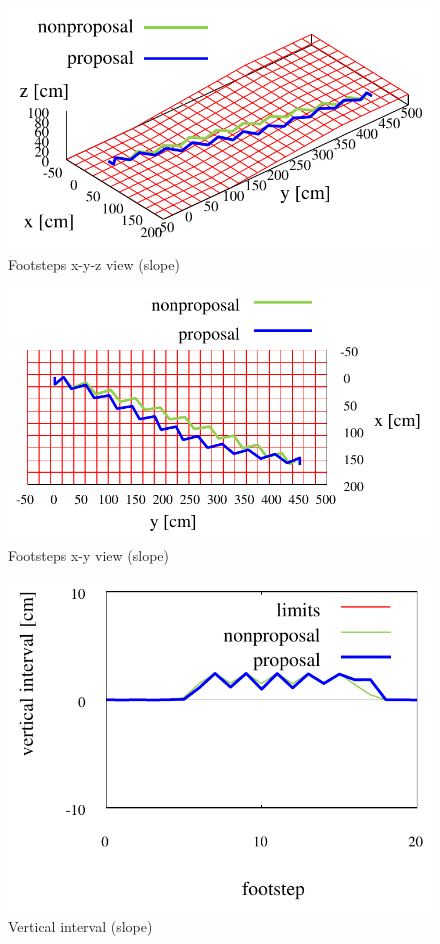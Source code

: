 \documentclass[autodetect-engine,dvipdfmx-if-dvi,ja=standard,a4j,jbase=11pt,magstyle=nomag*]{bxjsreport}
\begin{document}
\begin{figure}[pt]%
    \centering%
    \includegraphics[width=0.9\linewidth, clip]{./figure/sim_hrp2_slope_50_xyz.pdf}%
    \caption{Footsteps x-y-z view (slope)}%
    \label{fig:sim_hrp2_slope}%
\end{figure}
\begin{figure}[pt]%
    \centering%
    \includegraphics[width=0.8\linewidth, clip]{./figure/sim_hrp2_slope_50_xy.pdf}%
    \caption{Footsteps x-y view (slope)}%
    \label{fig:sim_hrp2_slope_xy}%
\end{figure}
\begin{figure}[pt]%
    \centering%
    \includegraphics[width=0.7\linewidth, clip]{./figure/sim_hrp2_slope_50_zdiff.pdf}%
    \caption{Vertical interval (slope)}%
    \label{fig:sim_hrp2_slope_zdiff}%
\end{figure}
\end{document}

